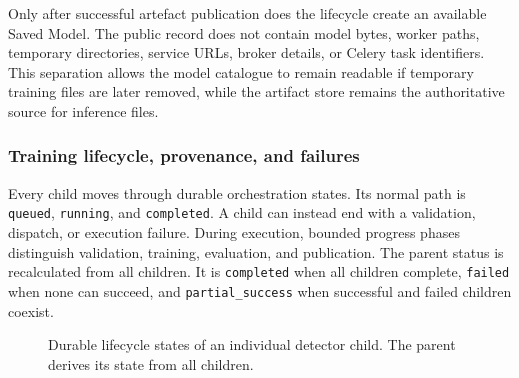 Only after successful artefact publication does the lifecycle create an available Saved Model. The public record does not contain model bytes, worker paths, temporary directories, service URLs, broker details, or Celery task identifiers. This separation allows the model catalogue to remain readable if temporary training files are later removed, while the artifact store remains the authoritative source for inference files.

\subsubsection{Training lifecycle, provenance, and failures}

Every child moves through durable orchestration states. Its normal path is \texttt{queued}, \texttt{running}, and \texttt{completed}. A child can instead end with a validation, dispatch, or execution failure. During execution, bounded progress phases distinguish validation, training, evaluation, and publication. The parent status is recalculated from all children. It is \texttt{completed} when all children complete, \texttt{failed} when none can succeed, and \texttt{partial\_success} when successful and failed children coexist.

\begin{figure}[H]
    \centering
    \caption{Durable lifecycle states of an individual detector child. The parent derives its state from all children.}
    \label{fig:training_child_lifecycle}
\end{figure}

